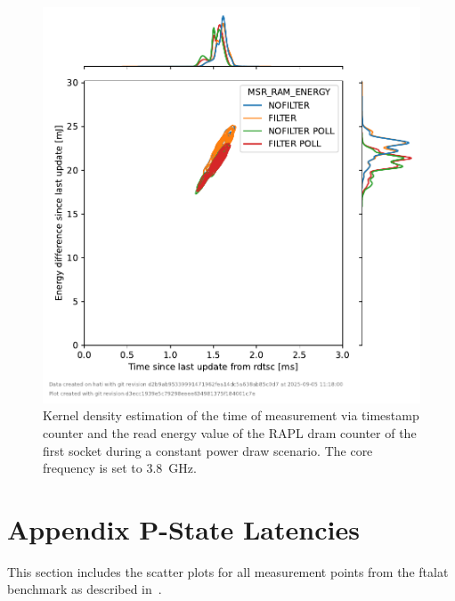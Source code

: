 \begin{figure}[]
    \centering
    \includegraphics[width=0.54\columnwidth]{fig/rapl-update-intervals/MSR_RAM_ENERGY_3800000.pdf}
    \caption{Kernel density estimation of the time of measurement via timestamp counter and the read energy value of the RAPL dram counter of the first socket during a constant power draw scenario.
    The core frequency is set to \SI{3.8}{\GHz}.}
\end{figure}


\chapter{Appendix P-State Latencies}
\label{app:pstate_latencies_scatter_complete}
This section includes the scatter plots for all measurement points from the ftalat benchmark as described in~.

